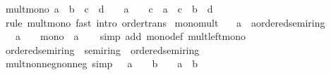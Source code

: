 \begin{isabellebody}
\ mult{\isacharunderscore}{\kern0pt}mono{\isacharprime}{\kern0pt}{\isacharcolon}{\kern0pt}\ {\isachardoublequoteopen}a\ {\isasymle}\ b\ {\isasymLongrightarrow}\ c\ {\isasymle}\ d\ {\isasymLongrightarrow}\ {}\ {\isasymle}\ a\ {\isasymLongrightarrow}\ {}\ {\isasymle}\ c\ {\isasymLongrightarrow}\ a\ {\isacharasterisk}{\kern0pt}\ c\ {\isasymle}\ b\ {\isacharasterisk}{\kern0pt}\ d{\isachardoublequoteclose}\isanewline
%
\isadelimproof
\ \ %
\endisadelimproof
%
\isatagproof
{}\isamarkupfalse%
\ {\isacharparenleft}{\kern0pt}rule\ mult{\isacharunderscore}{\kern0pt}mono{\isacharparenright}{\kern0pt}\ {\isacharparenleft}{\kern0pt}fast\ intro{\isacharcolon}{\kern0pt}\ order{\isacharunderscore}{\kern0pt}trans{\isacharparenright}{\kern0pt}{\isacharplus}{\kern0pt}%
\endisatagproof
{\isafoldproof}%
%
\isadelimproof
\isanewline
%
\endisadelimproof
\isanewline
{}\isamarkupfalse%
\isanewline
\isanewline
{}\isamarkupfalse%
\ mono{\isacharunderscore}{\kern0pt}mult{\isacharcolon}{\kern0pt}\isanewline
\ \ \ a\ {\isacharcolon}{\kern0pt}{\isacharcolon}{\kern0pt}\ {\isachardoublequoteopen}{\isacharprime}{\kern0pt}a{\isacharcolon}{\kern0pt}{\isacharcolon}{\kern0pt}ordered{\isacharunderscore}{\kern0pt}semiring{\isachardoublequoteclose}\ \isanewline
\ \ \ {\isachardoublequoteopen}a\ {\isasymge}\ {}\ {\isasymLongrightarrow}\ mono\ {\isacharparenleft}{\kern0pt}{\isacharparenleft}{\kern0pt}{\isacharasterisk}{\kern0pt}{\isacharparenright}{\kern0pt}\ a{\isacharparenright}{\kern0pt}{\isachardoublequoteclose}\isanewline
%
\isadelimproof
\ \ %
\endisadelimproof
%
\isatagproof
{}\isamarkupfalse%
\ {\isacharparenleft}{\kern0pt}simp\ add{\isacharcolon}{\kern0pt}\ mono{\isacharunderscore}{\kern0pt}def\ mult{\isacharunderscore}{\kern0pt}left{\isacharunderscore}{\kern0pt}mono{\isacharparenright}{\kern0pt}%
\endisatagproof
{\isafoldproof}%
%
\isadelimproof
\isanewline
%
\endisadelimproof
\isanewline
{}\isamarkupfalse%
\ ordered{\isacharunderscore}{\kern0pt}semiring{\isacharunderscore}{\kern0pt}{}\ {\isacharequal}{\kern0pt}\ semiring{\isacharunderscore}{\kern0pt}{}\ {\isacharplus}{\kern0pt}\ ordered{\isacharunderscore}{\kern0pt}semiring\isanewline
{}\isanewline
\isanewline
{}\isamarkupfalse%
\ mult{\isacharunderscore}{\kern0pt}nonneg{\isacharunderscore}{\kern0pt}nonneg\ {\isacharbrackleft}{\kern0pt}simp{\isacharbrackright}{\kern0pt}{\isacharcolon}{\kern0pt}\ {\isachardoublequoteopen}{}\ {\isasymle}\ a\ {\isasymLongrightarrow}\ {}\ {\isasymle}\ b\ {\isasymLongrightarrow}\ {}\ {\isasymle}\ a\ {\isacharasterisk}{\kern0pt}\ b{\isachardoublequoteclose}\isanewline

\end{isabellebody}
